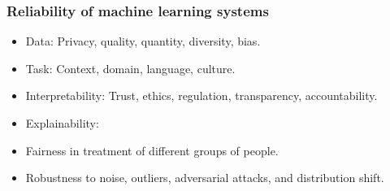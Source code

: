 \begin{frame}
    \frametitle{Reliability of machine learning systems}
    \begin{itemize}
        \item <1-> {\color{dtured}Data}: Privacy, quality, quantity, diversity, bias.
        \item <2-> {\color{dtured}Task}: Context, domain, language, culture.
        \item <3-> {\color{dtured}Interpretability}: Trust, ethics, regulation, transparency, accountability.
        \item <3-> {\color{dtured}Explainability}: 
        \item <4-> {\color{dtured}Fairness} in treatment of different groups of people.
        \item <5-> {\color{dtured}Robustness} to noise, outliers, adversarial attacks, and distribution shift.
    \end{itemize}

\end{frame}

